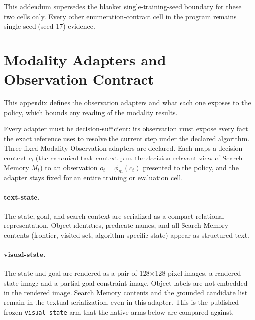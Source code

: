 This addendum supersedes the blanket single-training-seed boundary for these two cells only. Every other enumeration-contract cell in the program remains single-seed (seed 17) evidence.


\section{Modality Adapters and Observation Contract}

This appendix defines the observation adapters and what each one exposes to the policy, which bounds any reading of the modality results.

Every adapter must be decision-sufficient: its observation must expose every fact the exact reference uses to resolve the current step under the declared algorithm. Three fixed Modality Observation adapters are declared. Each maps a decision context $c_t$ (the canonical task context plus the decision-relevant view of Search Memory $M_t$) to an observation $o_t = \phi_m(c_t)$ presented to the policy, and the adapter stays fixed for an entire training or evaluation cell.

\paragraph{text-state.}
The state, goal, and search context are serialized as a compact relational representation. Object identities, predicate names, and all Search Memory contents (frontier, visited set, algorithm-specific state) appear as structured text.

\paragraph{visual-state.}
The state and goal are rendered as a pair of 128$\times$128 pixel images, a rendered state image and a partial-goal constraint image. Object labels are not embedded in the rendered image. Search Memory contents and the grounded candidate list remain in the textual serialization, even in this adapter. This is the published frozen \texttt{visual-state} arm that the native arms below are compared against.

